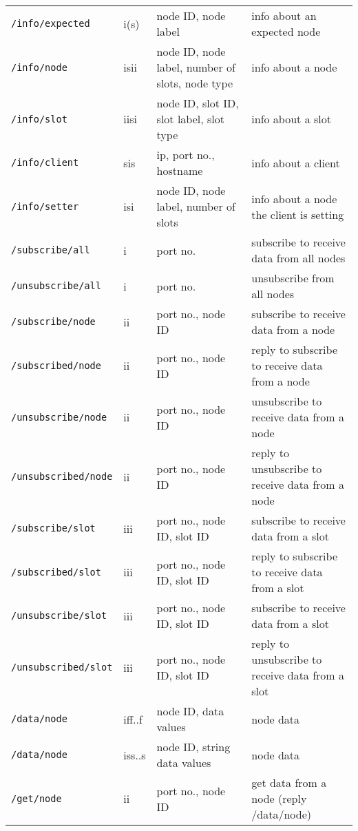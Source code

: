 \documentclass[letterpaper,10pt]{article}
\begin{document}
\begin{sidewaystable}[!tbp]
\begin{center}
\begin{tabular}{|llll|}
\verb|/info/expected| & i(s) & node ID, node label & info about an expected node \\
\verb|/info/node| & isii & node ID, node label, number of slots, node type & info about a node \\
\verb|/info/slot| & iisi & node ID, slot ID, slot label, slot type & info about a slot \\
\verb|/info/client| & sis & ip, port no., hostname & info about a client \\
\verb|/info/setter| & isi & node ID, node label, number of slots & info about a node the client is setting \\

\verb|/subscribe/all| & i & port no. & subscribe to receive data from all nodes \\
\verb|/unsubscribe/all| & i & port no. & unsubscribe from all nodes \\

\verb|/subscribe/node| & ii & port no., node ID & subscribe to receive data from a node \\
\verb|/subscribed/node| & ii & port no., node ID & reply to subscribe to receive data from a node \\

\verb|/unsubscribe/node| & ii & port no., node ID & unsubscribe to receive data from a node \\
\verb|/unsubscribed/node| & ii & port no., node ID & reply to unsubscribe to receive data from a node \\

\verb|/subscribe/slot| & iii & port no., node ID, slot ID & subscribe to receive data from a slot \\  
\verb|/subscribed/slot| & iii & port no., node ID, slot ID & reply to subscribe to receive data from a slot \\  

\verb|/unsubscribe/slot| & iii & port no., node ID, slot ID & subscribe to receive data from a slot \\  
\verb|/unsubscribed/slot| & iii & port no., node ID, slot ID & reply to unsubscribe to receive data from a slot \\  

\verb|/data/node| & iff..f & node ID, data values & node data \\
\verb|/data/node| & iss..s & node ID, string data values & node data \\
\verb|/get/node| & ii & port no., node ID & get data from a node (reply /data/node) \\


\end{tabular}
\end{center}
\end{sidewaystable}
\end{document}
